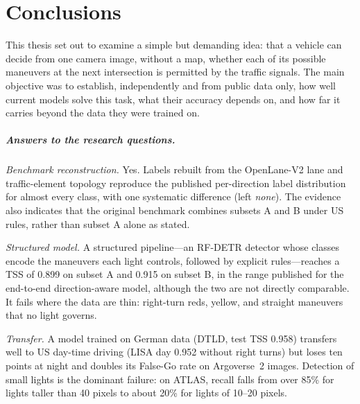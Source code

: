 \chapter*{Conclusions}

This thesis set out to examine a simple but demanding idea: that a vehicle can decide from one camera
image, without a map, whether each of its possible maneuvers at the next intersection is permitted by
the traffic signals. The main objective was to establish, independently and from public data only, how
well current models solve this task, what their accuracy depends on, and how far it carries beyond the
data they were trained on.

\paragraph{Answers to the research questions.}
\begin{description}[leftmargin=1.2cm,style=nextline]
  \item[RQ1] \emph{Benchmark reconstruction.} Yes. Labels rebuilt from the OpenLane-V2 lane and
        traffic-element topology reproduce the published per-direction label distribution for almost
        every class, with one systematic difference (left \emph{none}). The evidence also indicates that
        the original benchmark combines subsets A and B under US rules, rather than subset A alone as
        stated.
  \item[RQ2] \emph{Structured model.} A structured pipeline---an RF-DETR detector whose classes encode
        the maneuvers each light controls, followed by explicit rules---reaches a TSS of 0.899 on subset A
        and 0.915 on subset B, in the range published for the end-to-end direction-aware model, although
        the two are not directly comparable. It fails where the data are thin: right-turn reds, yellow,
        and straight maneuvers that no light governs.
  \item[RQ3] \emph{Transfer.} A model trained on German data (DTLD, test TSS 0.958) transfers well to US
        day-time driving (LISA day 0.952 without right turns) but loses ten points at night and doubles
        its False-Go rate on Argoverse~2 images. Detection of small lights is the dominant failure: on
        ATLAS, recall falls from over 85\% for lights taller than 40 pixels to about 20\% for lights of
        10--20 pixels.
\end{description}

